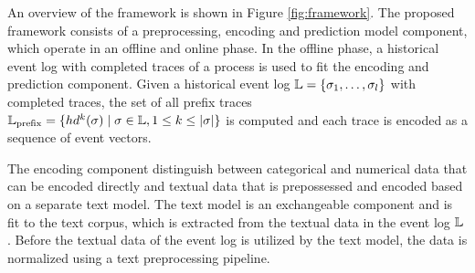 An overview of the framework is shown in Figure \ref{fig:framework}.
The proposed framework consists of a preprocessing, encoding and prediction model component, which operate in an offline and online phase.
In the offline phase, a historical event log with completed traces of a process is used to fit the encoding and prediction component.
Given a historical event log $\mathbb{L} = \{\sigma_1, \dots, \sigma_l\}$ with completed traces, the set of all prefix traces $\mathbb{L}_\mathrm{prefix} = \{ hd^k(\sigma) \mid  \sigma \in \mathbb{L}, 1 \leq k \leq |\sigma|\}$ is computed and each trace is encoded as a sequence of event vectors.

The encoding component distinguish between categorical and numerical data that can be encoded directly and textual data that is prepossessed and encoded based on a separate text model.
The text model is an exchangeable component and is fit to the text corpus, which is extracted from the textual data in the event log $\mathbb{L}$.
Before the textual data of the event log is utilized by the text model, the data is normalized using a text preprocessing pipeline.

